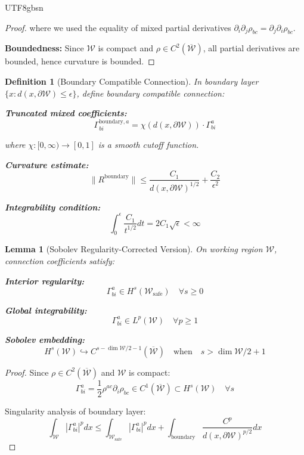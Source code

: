 \documentclass[a4paper,12pt]{extarticle}
\newtheorem{lemma}[theorem]{Lemma}
\newtheorem{definition}{Definition}
\theoremstyle{definition}
\begin{document}
\begin{CJK}{UTF8}{gbsn}
\begin{proof}
where we used the equality of mixed partial derivatives $\partial_i \partial_j \rho_{bc} = \partial_j \partial_i \rho_{bc}$.

\textbf{Boundedness:} Since $\mathcal{W}$ is compact and $\rho \in C^2(\overline{\mathcal{W}})$, all partial derivatives are bounded, hence curvature is bounded.
\end{proof}

\begin{definition}[Boundary Compatible Connection]
In boundary layer $\{x : d(x,\partial \mathcal{W}) \leq \epsilon\}$, define boundary compatible connection:

\textbf{Truncated mixed coefficients:}
$$\Gamma^{\text{boundary},a}_{bi} = \chi(d(x,\partial \mathcal{W})) \cdot \Gamma^a_{bi}$$

where $\chi: [0,\infty) \to [0,1]$ is a smooth cutoff function.

\textbf{Curvature estimate:}
$$\|R^{\text{boundary}}\| \leq \frac{C_1}{d(x,\partial \mathcal{W})^{1/2}} + \frac{C_2}{\epsilon^2}$$

\textbf{Integrability condition:}
$$\int_0^{\epsilon} \frac{C_1}{t^{1/2}} dt = 2C_1\sqrt{\epsilon} < \infty$$
\end{definition}

\begin{lemma}[Sobolev Regularity-Corrected Version]
On working region $\mathcal{W}$, connection coefficients satisfy:

\textbf{Interior regularity:}
$$\Gamma^a_{bi} \in H^s(\mathcal{W}_{\text{safe}}) \quad \forall s \geq 0$$

\textbf{Global integrability:}
$$\Gamma^a_{bi} \in L^p(\mathcal{W}) \quad \forall p \geq 1$$

\textbf{Sobolev embedding:}
$$H^s(\mathcal{W}) \hookrightarrow C^{s-\dim \mathcal{W}/2-1}(\overline{\mathcal{W}}) \quad \text{when} \quad s > \dim \mathcal{W}/2 + 1$$
\end{lemma}

\begin{proof}
Since $\rho \in C^2(\overline{\mathcal{W}})$ and $\mathcal{W}$ is compact:
$$\Gamma^a_{bi} = \frac{1}{2}\rho^{ac} \partial_i \rho_{bc} \in C^1(\overline{\mathcal{W}}) \subset H^s(\mathcal{W}) \quad \forall s$$

Singularity analysis of boundary layer:
$$\int_{\mathcal{W}} |\Gamma^a_{bi}|^p dx \leq \int_{\mathcal{W}_{\text{safe}}} |\Gamma^a_{bi}|^p dx + \int_{\text{boundary}} \frac{C^p}{d(x,\partial \mathcal{W})^{p/2}} dx$$


\end{proof}
\end{CJK}
\end{document}
